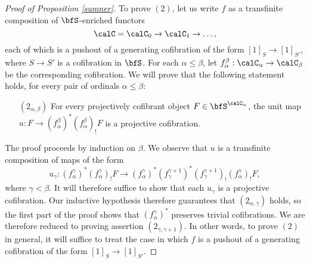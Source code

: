 \begin{Simplicial Categories}
\begin{proof}[Proof of Proposition \ref{sumner}]
To prove $(2)$, let us write $f$ as a transfinite composition of $\bfS$-enriched functors
$$ \calC = \calC_0 \rightarrow \calC_1 \rightarrow \ldots, $$
each of which is a pushout of a generating cofibration of the form $[1]_{S} \rightarrow [1]_{S'}$, where
$S \rightarrow S'$ is a cofibration in $\bfS$. 
For each $\alpha \leq \beta$, let $f^{\beta}_{\alpha}: \calC_{\alpha} \rightarrow \calC_{\beta}$
be the corresponding cofibration. We will prove that the following statement holds, for
every pair of ordinals $\alpha \leq \beta$:
\begin{itemize}
\item[$(2_{\alpha,\beta})$] For every projectively cofibrant object $F \in \bfS^{\calC_{\alpha} }$,
the unit map $u: F \rightarrow (f_{\alpha}^{\beta})^{\ast} (f_{\alpha}^{\beta})_{!} F$
is a projective cofibration.
\end{itemize}

The proof proceeds by induction on $\beta$. We observe that $u$ is a transfinite
composition of maps of the form
$$ u_{\gamma}: (f_{\alpha}^{\gamma})^{\ast} (f_{\alpha}^{\gamma})_{!} F \rightarrow
(f_{\alpha}^{\gamma})^{\ast} (f_{\gamma}^{\gamma+1})^{\ast}
(f_{\gamma}^{\gamma+1})_{!} (f_{\alpha}^{\gamma})_{!} F,$$
where $\gamma < \beta$. It will therefore suffice to show that each $u_{\gamma}$ is a projective cofibration. Our inductive hypothesis therefore guarantees that
$(2_{\alpha, \gamma})$ holds, so the first part of the proof shows that
$(f_{\alpha}^{\gamma})^{\ast}$ preserves trivial cofibrations. We are therefore reduced to proving
assertion $(2_{\gamma, \gamma+1})$. In other words, to prove $(2)$ in general, it will suffice to
treat the case in which $f$ is a pushout of a generating cofibration of the form $[1]_{S} \rightarrow [1]_{S'}$. 


\end{proof}
\end{Simplicial Categories}
